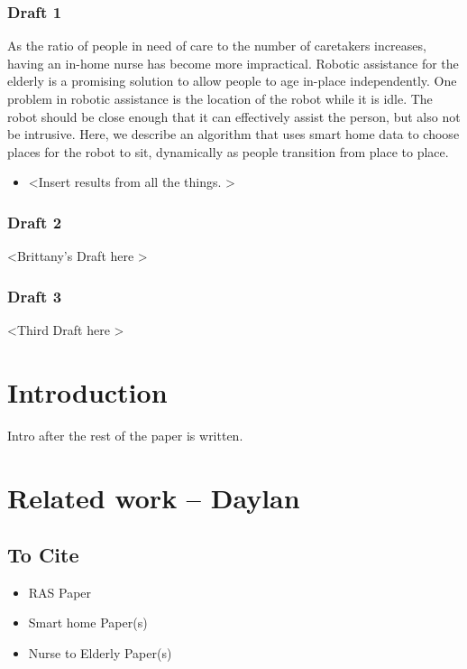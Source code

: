 \documentclass[11pt, conference, a4paper]{IEEEtran}
\begin{document}
\subsubsection{Draft 1}

As the ratio of people in need of care to the number of caretakers increases, having an in-home nurse has become more impractical. Robotic assistance for the elderly is a promising solution to allow people to age in-place independently. One problem in robotic assistance is the location of the robot while it is idle. The robot should be close enough that it can effectively assist the person, but also not be intrusive. Here, we describe an algorithm that uses smart home data to choose places for the robot to sit, dynamically as people transition from place to place. 

\begin{itemize}
	\item \textless Insert results from all the things. \textgreater
\end{itemize}


\subsubsection{Draft 2}
\textless Brittany's Draft here \textgreater


\subsubsection{Draft 3}
\textless Third Draft here \textgreater


\section{Introduction}
Intro after the rest of the paper is written. 


\section{Related work -- Daylan}

\subsection{To Cite}
\begin{itemize}
    \item RAS Paper
    \item Smart home Paper(s)
    \item Nurse to Elderly Paper(s)
\end{itemize}
\end{document}
